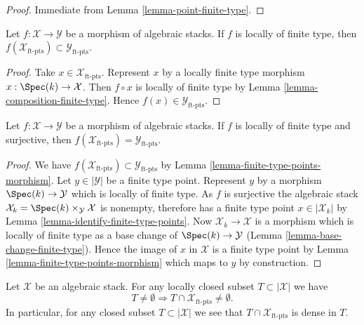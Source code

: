 \begin{proof}
Immediate from
Lemma \ref{lemma-point-finite-type}.
\end{proof}

\begin{lemma}
\label{lemma-finite-type-points-morphism}
Let $f : \mathcal{X} \to \mathcal{Y}$ be a morphism of algebraic stacks.
If $f$ is locally of finite type, then
$f(\mathcal{X}_{\text{ft-pts}}) \subset \mathcal{Y}_{\text{ft-pts}}$.
\end{lemma}

\begin{proof}
Take $x \in \mathcal{X}_{\text{ft-pts}}$. Represent $x$ by a locally
finite type morphism $x : \Spec(k) \to \mathcal{X}$. Then
$f \circ x$ is locally of finite type by
Lemma \ref{lemma-composition-finite-type}.
Hence $f(x) \in \mathcal{Y}_{\text{ft-pts}}$.
\end{proof}

\begin{lemma}
\label{lemma-finite-type-points-surjective-morphism}
Let $f : \mathcal{X} \to \mathcal{Y}$ be a morphism of algebraic stacks.
If $f$ is locally of finite type and surjective, then
$f(\mathcal{X}_{\text{ft-pts}}) = \mathcal{Y}_{\text{ft-pts}}$.
\end{lemma}

\begin{proof}
We have $f(\mathcal{X}_{\text{ft-pts}}) \subset \mathcal{Y}_{\text{ft-pts}}$ by
Lemma \ref{lemma-finite-type-points-morphism}.
Let $y \in |\mathcal{Y}|$ be a finite type point. Represent $y$ by a morphism
$\Spec(k) \to \mathcal{Y}$ which is locally of finite type.
As $f$ is surjective the algebraic stack
$\mathcal{X}_k = \Spec(k) \times_\mathcal{Y} \mathcal{X}$ is nonempty,
therefore has a finite type point $x \in |\mathcal{X}_k|$ by
Lemma \ref{lemma-identify-finite-type-points}.
Now $\mathcal{X}_k \to \mathcal{X}$ is a morphism which is locally of finite
type as a base change of $\Spec(k) \to \mathcal{Y}$
(Lemma \ref{lemma-base-change-finite-type}).
Hence the image of $x$ in $\mathcal{X}$ is a finite type point by
Lemma \ref{lemma-finite-type-points-morphism}
which maps to $y$ by construction.
\end{proof}

\begin{lemma}
\label{lemma-enough-finite-type-points}
Let $\mathcal{X}$ be an algebraic stack.
For any locally closed subset $T \subset |\mathcal{X}|$ we have
$$
T \not = \emptyset
\Rightarrow
T \cap \mathcal{X}_{\text{ft-pts}} \not = \emptyset.
$$
In particular, for any closed subset $T \subset |\mathcal{X}|$ we
see that $T \cap \mathcal{X}_{\text{ft-pts}}$ is dense in $T$.
\end{lemma}

